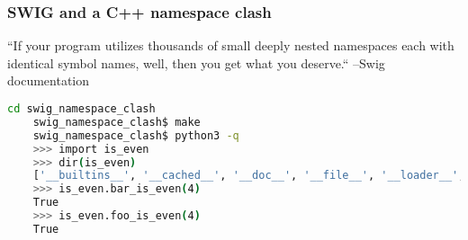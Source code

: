 \documentclass{beamer}
\begin{document}
\begin{frame}[fragile]
  \frametitle{SWIG and a C++ namespace clash}
  ``If your program utilizes thousands of small deeply nested namespaces each with identical symbol names, well, then
  you get what you deserve.`` --Swig documentation
  \begin{lstlisting}[language=bash]
    cd swig_namespace_clash
    swig_namespace_clash$ make
    swig_namespace_clash$ python3 -q
    >>> import is_even
    >>> dir(is_even)
    ['__builtins__', '__cached__', '__doc__', '__file__', '__loader__', '__name__', '__package__', '__spec__', '_is_even', '_newclass', '_object', '_swig_getattr', '_swig_getattr_nondynamic', '_swig_property', '_swig_repr', '_swig_setattr', '_swig_setattr_nondynamic', 'bar_is_even', 'foo_is_even']
    >>> is_even.bar_is_even(4)
    True
    >>> is_even.foo_is_even(4)
    True
   \end{lstlisting}
\end{frame}
\end{document}
